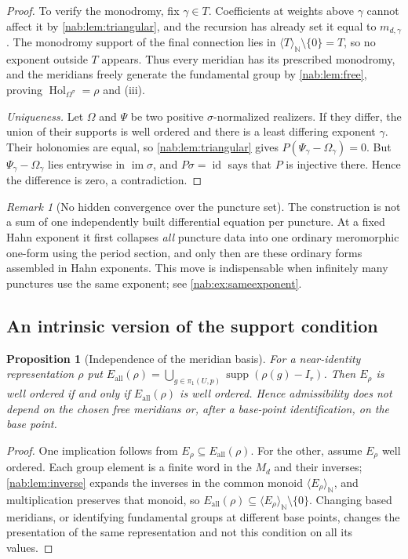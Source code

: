 \documentclass[11pt,letterpaper]{article}
\newtheorem{proposition}[proposition]{Proposition}
\theoremstyle{definition}
\theoremstyle{remark}
\newtheorem{remark}[remark]{Remark}
\newcommand{\N}{\mathbb N}
\newcommand{\supp}{\operatorname{supp}}
\newcommand{\Hol}{\operatorname{Hol}}
\newcommand{\im}{\operatorname{im}}
\newcommand{\id}{\operatorname{id}}
\newcommand{\angles}[1]{\langle #1\rangle_{\N}}
\numberwithin{equation}{section}
\begin{document}
\begin{proof}
To verify the monodromy, fix $\gamma\in T$. Coefficients at weights above
$\gamma$ cannot affect it by \cref{nab:lem:triangular}, and the recursion has
already set it equal to $m_{d,\gamma}$. The monodromy support of the final
connection lies in $\angles T\setminus\{0\}=T$, so no exponent outside $T$
appears. Thus every meridian has its prescribed monodromy, and the meridians
freely generate the fundamental group by \cref{nab:lem:free}, proving
$\Hol_{\Omega^\sigma}=\rho$ and (iii).

\emph{Uniqueness.} Let $\Omega$ and $\Psi$ be two positive
$\sigma$-normalized realizers. If they differ, the union of their supports is
well ordered and there is a least differing exponent $\gamma$. Their
holonomies are equal, so \cref{nab:lem:triangular} gives
$P(\Psi_\gamma-\Omega_\gamma)=0$. But $\Psi_\gamma-\Omega_\gamma$ lies
entrywise in $\im\sigma$, and $P\sigma=\id$ says that $P$ is injective there.
Hence the difference is zero, a contradiction.
\end{proof}

\begin{remark}[No hidden convergence over the puncture set]
\label{nab:rem:noconv}
The construction is not a sum of one independently built differential equation
per puncture. At a fixed Hahn exponent it first collapses \emph{all} puncture
data into one ordinary meromorphic one-form using the period section, and only
then are these ordinary forms assembled in Hahn exponents. This move is
indispensable when infinitely many punctures use the same exponent; see
\cref{nab:ex:sameexponent}.
\end{remark}

\subsection{An intrinsic version of the support condition}

\begin{proposition}[Independence of the meridian basis]
\label{nab:prop:intrinsic}
For a near-identity representation $\rho$ put
$E_{\mathrm{all}}(\rho)=\bigcup_{g\in\pi_1(U,p)}\supp(\rho(g)-I_r)$. Then
$E_\rho$ is well ordered if and only if $E_{\mathrm{all}}(\rho)$ is well
ordered. Hence admissibility does not depend on the chosen free meridians or,
after a base-point identification, on the base point.
\end{proposition}

\begin{proof}
One implication follows from $E_\rho\subseteq E_{\mathrm{all}}(\rho)$. For the
other, assume $E_\rho$ well ordered. Each group element is a finite word in the
$M_d$ and their inverses; \cref{nab:lem:inverse} expands the inverses in the
common monoid $\angles{E_\rho}$, and multiplication preserves that monoid, so
$E_{\mathrm{all}}(\rho)\subseteq\angles{E_\rho}\setminus\{0\}$. Changing based
meridians, or identifying fundamental groups at different base points, changes
the presentation of the same representation and not this condition on all its
values.
\end{proof}
\end{document}
